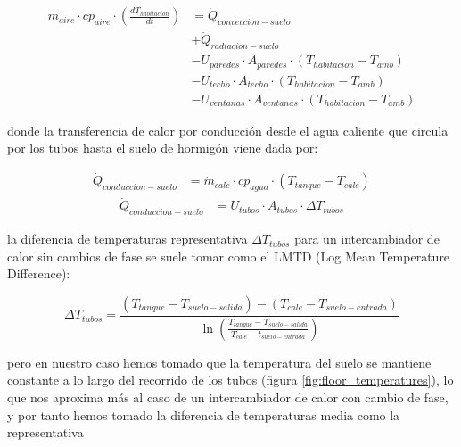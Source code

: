 \begin{align} \label{eq:room_energy_conservation}
	m_{aire} \cdot cp_{aire} \cdot \left( \frac{dT_{habitacion}}{dt} \right) & = \dot{Q}_{conveccion-suelo} \nonumber                                     \\
	                                                                         & + \dot{Q}_{radiacion-suelo} \nonumber                                      \\
	                                                                         & - U_{paredes} \cdot A_{paredes} \cdot (T_{habitacion} - T_{amb}) \nonumber \\
	                                                                         & - U_{techo} \cdot A_{techo} \cdot (T_{habitacion} - T_{amb}) \nonumber     \\
	                                                                         & - U_{ventanas} \cdot A_{ventanas} \cdot (T_{habitacion} - T_{amb})
\end{align}

donde la transferencia de calor por conducción desde el agua caliente que
circula por los tubos hasta el suelo de hormigón viene dada por:

\begin{align} \label{eq:q_conduccion_1}
	\dot{Q}_{conduccion-suelo} & = \dot{m}_{cale} \cdot cp_{agua} \cdot (T_{tanque} - T_{cale})
\end{align}
\begin{align} \label{eq:q_conduccion_2}
	\dot{Q}_{conduccion-suelo} & = U_{tubos} \cdot A_{tubos} \cdot \Delta T_{tubos}
\end{align}

la diferencia de temperaturas representativa $\Delta T_{tubos}$ para un
intercambiador de calor sin cambios de fase se suele tomar como el LMTD (Log
Mean Temperature Difference):

\begin{equation} \label{eq:lmtd}
	\Delta T_{tubos} = \frac{(T_{tanque} - T_{suelo-salida}) - (T_{cale} - T_{suelo-entrada})}{\ln\left(\frac{T_{tanque} - T_{suelo-salida}}{T_{cale} - t_{suelo-entrada} } \right) }
\end{equation}

pero en nuestro caso hemos tomado que la temperatura del suelo se mantiene
constante a lo largo del recorrido de los tubos (figura
\ref{fig:floor_temperatures}), lo que nos aproxima más al caso de un
intercambiador de calor con cambio de fase, y por tanto hemos tomado la
diferencia de temperaturas media como la representativa

